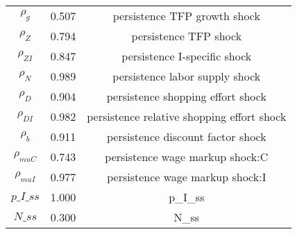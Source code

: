 \begin{center}
\begin{longtable}{ccc}
${\rho_g}$ 	 & 	 0.507 	 & 	 persistence TFP growth shock\\
${\rho_Z}$ 	 & 	 0.794 	 & 	 persistence TFP shock\\
${\rho_{ZI}}$ 	 & 	 0.847 	 & 	 persistence I-specific shock\\
${\rho_N}$ 	 & 	 0.989 	 & 	 persistence labor supply shock\\
${\rho_D}$ 	 & 	 0.904 	 & 	 persistence shopping effort shock\\
${\rho_{DI}}$ 	 & 	 0.982 	 & 	 persistence relative shopping effort shock\\
${\rho_b}$ 	 & 	 0.911 	 & 	 persistence discount factor shock\\
${\rho_{muC}}$ 	 & 	 0.743 	 & 	 persistence wage markup shock:C\\
${\rho_{muI}}$ 	 & 	 0.977 	 & 	 persistence wage markup shock:I\\
$p\_I\_ss$ 	 & 	 1.000 	 & 	 p\_I\_ss\\
$N\_ss$ 	 & 	 0.300 	 & 	 N\_ss\\
\bottomrule%
\end{longtable}
\end{center}
